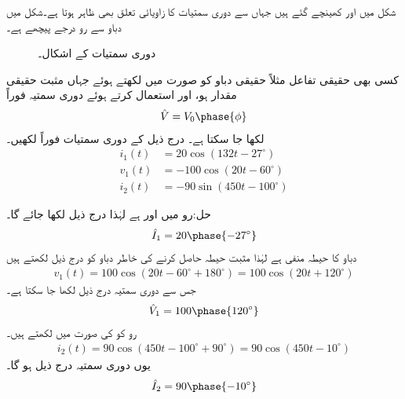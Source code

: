 شکل  میں  اور  کھینچے گئے ہیں جہاں سے دوری سمتیات کا زاویائی تعلق بھی ظاہر ہوتا ہے۔شکل  میں دباو سے رو  درجے پیچھے ہے۔
\begin{figure}
\centering
{}
\caption{دوری سمتیات کے اشکال۔}
\label{شکل_بدلتا_دوری_سمتیات}
\end{figure}

کسی بھی حقیقی تفاعل مثلاً حقیقی دباو کو  صورت میں لکھتے ہوئے جہاں  مثبت حقیقی مقدار ہو،  اور  استعمال کرتے ہوئے دوری سمتیہ فوراً
\begin{align}
\hat{V}=V_0\phase{\phi}
\end{align}
لکھا جا سکتا ہے۔
درج ذیل کے دوری سمتیات فوراً لکھیں۔
\begin{align*}
i_1(t)&=20\cos(132t-27^{\circ}) \\
 v_1(t)&=-100\cos(20t-60^{\circ})\\
 i_2(t)&=-90\sin(450t-100^{\circ})
\end{align*}

حل:رو  میں  اور  ہے لہٰذا درج ذیل لکھا جائے گا۔
\begin{align*}
\hat{I}_1=20\phase{-27^{\circ}}
\end{align*}
دباو کا حیطہ منفی ہے لہٰذا مثبت حیطہ حاصل کرنے کی خاطر دباو کو درج ذیل لکھتے ہیں
\begin{align*}
v_1(t)=100\cos(20t-60^{\circ}+180^{\circ})=100\cos(20t+120^{\circ})
\end{align*}
جس سے دوری سمتیہ درج ذیل لکھا جا سکتا ہے۔
\begin{align*}
\hat{V}_1=100\phase{120^{\circ}}
\end{align*}
رو  کو  کی صورت میں لکھتے ہیں۔
\begin{align*}
i_2(t)=90\cos(450t-100^{\circ}+90^{\circ})=90\cos(450t-10^{\circ})
\end{align*}
یوں دوری سمتیہ درج ذیل ہو گا۔
\begin{align*}
\hat{I}_2=90\phase{-10^{\circ}}
\end{align*}


